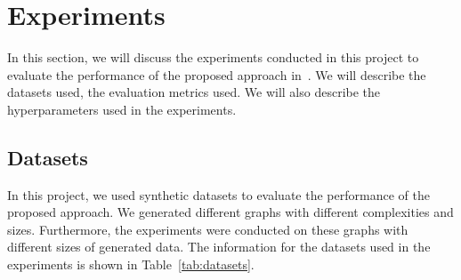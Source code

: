 \documentclass{lxaiproposal}
\begin{document}
    \section{Experiments}\label{sec:experiments}
    \vspace*{-3mm}

    In this section, we will discuss the experiments conducted in this project to evaluate the performance of the proposed
    approach in~\cite{deleu2022daggflownet}. We will describe the datasets used, the evaluation metrics used. We will
    also describe the hyperparameters used in the experiments.

    \subsection{Datasets}
    \vspace*{-3mm}

    In this project, we used synthetic datasets to evaluate the performance of the proposed approach. We generated
    different graphs with different complexities and sizes. Furthermore, the experiments were conducted on these
    graphs with different sizes of generated data. The information for the datasets used in the experiments is shown in
    Table~\ref{tab:datasets}.
\end{document}
